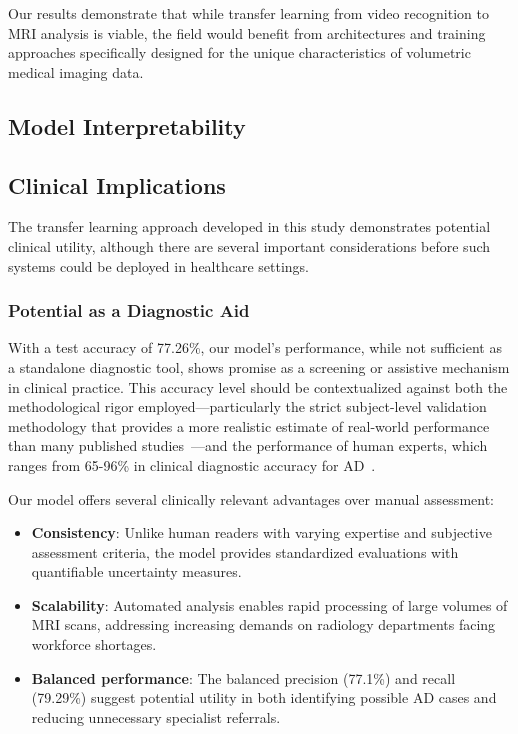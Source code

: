 \documentclass[12pt, a4paper]{article}
\begin{document}
Our results demonstrate that while transfer learning from video recognition to MRI analysis is viable, the field would benefit from architectures and training approaches specifically designed for the unique characteristics of volumetric medical imaging data.

\subsection{Model Interpretability}

\subsection{Clinical Implications}

The transfer learning approach developed in this study demonstrates potential clinical utility, although there are several important considerations before such systems could be deployed in healthcare settings.

\subsubsection{Potential as a Diagnostic Aid}

With a test accuracy of 77.26\%, our model's performance, while not sufficient as a standalone diagnostic tool, shows promise as a screening or assistive mechanism in clinical practice. This accuracy level should be contextualized against both the methodological rigor employed—particularly the strict subject-level validation methodology that provides a more realistic estimate of real-world performance than many published studies~\cite{davatzikos2019machine}—and the performance of human experts, which ranges from 65-96\% in clinical diagnostic accuracy for AD~\cite{kloppel2008accuracy}.

Our model offers several clinically relevant advantages over manual assessment:

\begin{itemize}
    \item \textbf{Consistency}: Unlike human readers with varying expertise and subjective assessment criteria, the model provides standardized evaluations with quantifiable uncertainty measures.
    
    \item \textbf{Scalability}: Automated analysis enables rapid processing of large volumes of MRI scans, addressing increasing demands on radiology departments facing workforce shortages.
    
    \item \textbf{Balanced performance}: The balanced precision (77.1\%) and recall (79.29\%) suggest potential utility in both identifying possible AD cases and reducing unnecessary specialist referrals.
\end{itemize}
\end{document}
